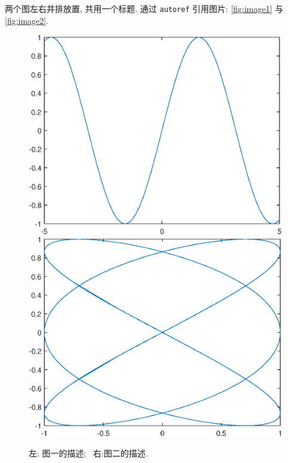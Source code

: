 \documentclass[UTF8,openany,twoside,12pt]{book}
\theoremstyle{plain}
\begin{document}
两个图左右并排放置, 共用一个标题. 通过 \verb|autoref| 引用图片: \autoref{fig:image1} 与 \autoref{fig:image2}.
\begin{figure}[htp!]
\centering
  \includegraphics[width=0.45\linewidth]{image1.eps}
  \hfill
  \includegraphics[width=0.45\linewidth]{image2.eps}
  \caption{左: 图一的描述;~ 右:图二的描述.}
  \label{fig:image}
\end{figure}
\end{document}
